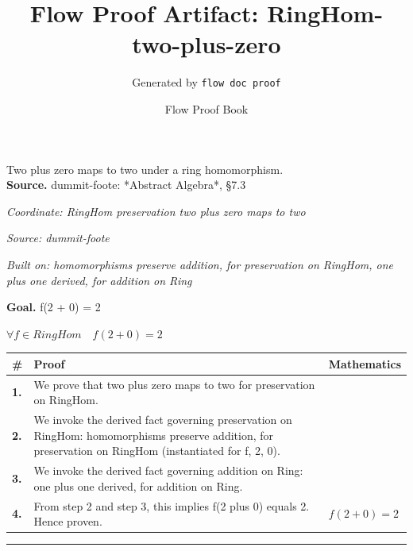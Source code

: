 \documentclass[11pt]{article}
\title{Flow Proof Artifact: RingHom-two-plus-zero}
\author{Generated by \texttt{flow doc proof}}
\date{Flow Proof Book}
\theoremstyle{definition}
\begin{document}
\maketitle
Two plus zero maps to two under a ring homomorphism.\\[0.5em]
\textbf{Source.} dummit-foote: *Abstract Algebra*, §7.3\\[0.5em]
\bigskip
{}\par
\smallskip\noindent\textit{Coordinate: RingHom \cdot preservation \cdot two plus zero maps to two}\par
\smallskip\noindent\textit{Source: dummit-foote}\par
\smallskip\noindent\textit{Built on: homomorphisms preserve addition, for preservation on RingHom, one plus one derived, for addition on Ring}\par
\medskip
\noindent\textbf{Goal.} f(2 + 0) = 2\par
\noindent$\displaystyle \forall f \in RingHom\quad f(2 + 0) = 2$\par
\medskip
\noindent
\begin{tabular}{@{} >{\raggedright\arraybackslash}p{} >{\raggedright\arraybackslash}p{} >{\raggedleft\arraybackslash}p{} @{}}
\textbf{\#} & \textbf{Proof} & \textbf{Mathematics} \\
\midrule
\textbf{1.} & We prove that two plus zero maps to two for preservation on RingHom. & \\[0.45em]
\textbf{2.} & We invoke the derived fact governing preservation on RingHom: homomorphisms preserve addition, for preservation on RingHom (instantiated for f, 2, 0). & \\[0.45em]
\textbf{3.} & We invoke the derived fact governing addition on Ring: one plus one derived, for addition on Ring. & \\[0.45em]
\textbf{4.} & From step 2 and step 3, this implies f(2 plus 0) equals 2. Hence proven. & $\displaystyle f(2 + 0) = 2$ \\[0.45em]
\bottomrule
\end{tabular}
\label{thm:RingHom-preservation-two_plus_zero_maps_to_two}
\par\medskip\hrule
\end{document}
